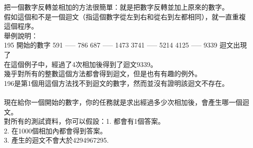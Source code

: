 把一個數字反轉並相加的方法很簡單：就是把數字反轉並加上原來的數字。\\
假如這個和不是一個迴文（指這個數字從左到右和從右到左都相同），就一直重複這個程序。\\
舉例說明：\\
195 開始的數字 591 ----- 786 687 ----- 1473 3741 ----- 5214 4125 ----- 9339 迴文出現了\\
在這個例子中，經過了4次相加後得到了迴文9339。\\
幾乎對所有的整數這個方法都會得到迴文，但是也有有趣的例外。\\
196是第1個用這個方法找不到迴文的數字，然而並沒有證明該迴文不存在。\\
\\
現在給你一個開始的數字，你的任務就是求出經過多少次相加後，會產生哪一個迴文。\\
對所有的測試資料，你可以假設：1. 都會有1個答案。\\
2. 在1000個相加內都會得到答案。\\
 3. 產生的迴文不會大於4294967295.